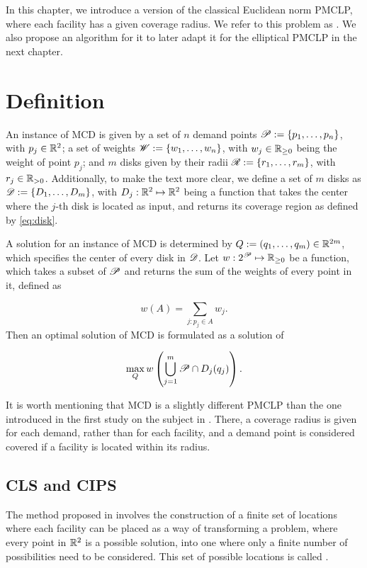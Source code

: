In this chapter, we introduce a version of the classical Euclidean norm PMCLP, where each facility has a given coverage radius. 
We refer to this problem as . We also propose an algorithm for it to later adapt it for the elliptical PMCLP in the next chapter. 

\section{Definition}

An instance of MCD is given by a set of $n$ demand points $\mathscr{P}:=\{p_1, \dots, p_n\}$, with $p_j\in\mathbb{R}^2$; a set of weights $\mathscr{W}:=\{w_1, \dots, w_n\}$, with $w_j\in\mathbb{R}_{\ge0}$ being the weight of point $p_j$; and $m$ disks given by their radii $\mathscr{R}:=\{r_1, \dots, r_m\}$, with $r_j\in\mathbb{R}_{>0}$. 
Additionally, to make the text more clear, we define a set of $m$ disks as $\mathscr{D}:=\{D_1, \dots, D_m\}$, with $D_j : \mathbb{R}^2 \mapsto \mathbb{R}^2$ being a function that takes the center where the $j$-th disk is located as input, and returns its coverage region as defined by \autoref{eq:disk}.

A solution for an instance of MCD is determined by $Q:=(q_1, \dots, q_m) \in \mathbb{R}^{2m}$, which specifies the center of every disk in $\mathscr{D}$. Let $w: 2^{\mathscr{P}} \mapsto \mathbb{R}_{\ge0}$ be a function, which takes a subset of $\mathscr{P}$ and returns the sum of the weights of every point in it, defined as

\begin{equation}\label{eq:subset_w}
w(A) = \sum_{j : p_j \in A} w_j.
\end{equation}
Then an optimal solution of MCD is formulated as a solution of

\begin{equation*}
\max_{Q} w\left(\bigcup_{j=1}^m \mathscr{P} \cap D_j(q_j)\right).
\end{equation*}

It is worth mentioning that MCD is a slightly different PMCLP than the one introduced in the first study on the subject in . There, a coverage radius is given for each demand, rather than for each facility, and a demand point is considered covered if a facility is located within its radius.

\subsection{CLS and CIPS}

The method proposed in  involves the construction of a finite set of locations where each facility can be placed as a way of transforming a problem, where every point in $\mathbb{R}^2$ is a possible solution, into one where only a finite number of possibilities need to be considered. This set of possible locations is called .

